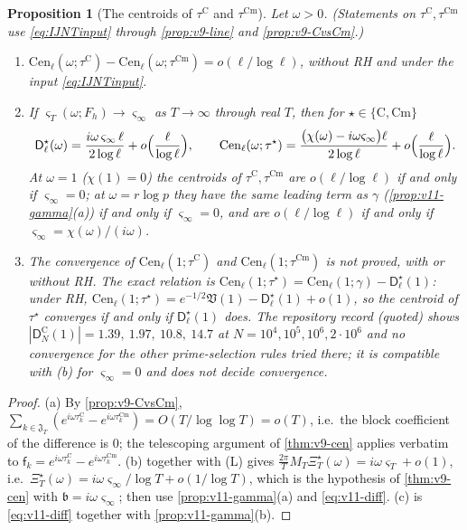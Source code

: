 \documentclass[11pt,a4paper]{article}
\numberwithin{equation}{section}
\newtheorem{proposition}[theorem]{Proposition}
\theoremstyle{definition}
\theoremstyle{remark}
\newcommand{\Cm}{\mathrm{Cm}}
\begin{document}
\begin{proposition}[The centroids of $\tau^{\mathrm C}$ and $\tau^{\Cm}$]\label{prop:v11-tau}
Let $\omega>0$. (Statements on $\tau^{\mathrm C},\tau^{\Cm}$ use \eqref{eq:IJNTinput} through \cref{prop:v9-line} and \cref{prop:v9-CvsCm}.)
\begin{enumerate}[label=(\alph*),leftmargin=*]
\item $\mathrm{Cen}_\ell(\omega;\tau^{\mathrm C})-\mathrm{Cen}_\ell(\omega;\tau^{\Cm})=o(\ell/\log\ell)$, without RH and under the input \eqref{eq:IJNTinput}.
\item If $\varsigma_T(\omega;F_h)\to\varsigma_\infty$ as $T\to\infty$ through real $T$, then for $\star\in\{\mathrm C,\Cm\}$
\begin{equation}
\mathsf D_\ell^\star(\omega)=\frac{i\omega\,\varsigma_\infty\,\ell}{2\log\ell}+o\Bigl(\frac\ell{\log\ell}\Bigr),\qquad
\mathrm{Cen}_\ell(\omega;\tau^\star)=\frac{\bigl(\chi(\omega)-i\omega\varsigma_\infty\bigr)\ell}{2\log\ell}+o\Bigl(\frac\ell{\log\ell}\Bigr).
\end{equation}
At $\omega=1$ ($\chi(1)=0$) the centroids of $\tau^{\mathrm C},\tau^{\Cm}$ are $o(\ell/\log\ell)$ if and only if $\varsigma_\infty=0$; at $\omega=r\log p$ they have the same leading term as $\gamma$ (\cref{prop:v11-gamma}(a)) if and only if $\varsigma_\infty=0$, and are $o(\ell/\log\ell)$ if and only if $\varsigma_\infty=\chi(\omega)/(i\omega)$.
\item The convergence of $\mathrm{Cen}_\ell(1;\tau^{\mathrm C})$ and $\mathrm{Cen}_\ell(1;\tau^{\Cm})$ is not proved, with or without RH. The exact relation is $\mathrm{Cen}_\ell(1;\tau^\star)=\mathrm{Cen}_\ell(1;\gamma)-\mathsf D_\ell^\star(1)$: under RH, $\mathrm{Cen}_\ell(1;\tau^\star)=e^{-1/2}\mathfrak V(1)-\mathsf D_\ell^\star(1)+o(1)$, so the centroid of $\tau^\star$ converges if and only if $\mathsf D_\ell^\star(1)$ does. The repository record (quoted) shows $|\mathsf D_N^{\mathrm C}(1)|=1.39,\ 1.97,\ 10.8,\ 14.7$ at $N=10^4,10^5,10^6,2\cdot10^6$ and no convergence for the other prime-selection rules tried there; it is compatible with (b) for $\varsigma_\infty=0$ and does not decide convergence.
\end{enumerate}
\end{proposition}
\begin{proof}
(a) By \cref{prop:v9-CvsCm}, $\sum_{k\in\mathfrak J_T}(e^{i\omega\tau_k^{\mathrm C}}-e^{i\omega\tau_k^{\Cm}})=O(T/\log\log T)=o(T)$, i.e.\ the block coefficient of the difference is $0$; the telescoping argument of \cref{thm:v9-cen} applies verbatim to $\mathsf f_k=e^{i\omega\tau_k^{\mathrm C}}-e^{i\omega\tau_k^{\Cm}}$. (b)  together with (L) gives $\frac{2\pi}{T}M_T\Xi_T^\star(\omega)=i\omega\varsigma_T+o(1)$, i.e.\ $\Xi_T^\star(\omega)=i\omega\varsigma_\infty/\log T+o(1/\log T)$, which is the hypothesis of \cref{thm:v9-cen} with $\mathfrak b=i\omega\varsigma_\infty$; then use \cref{prop:v11-gamma}(a) and \eqref{eq:v11-diff}. (c) is \eqref{eq:v11-diff} together with \cref{prop:v11-gamma}(b).
\end{proof}
\end{document}
